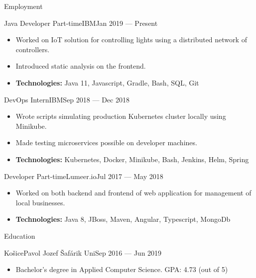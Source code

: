 \documentclass[]{style}
\begin{document}
	\makeheader

	\begin{cvsection}{Employment}
    	\begin{cvsubsection}{Java Developer Part-time}{IBM}{Jan 2019 — Present}
			\begin{itemize}
    			\item Worked on IoT solution for controlling lights using a distributed network of controllers.
    			\item Introduced static analysis on the frontend.
    			\item \textbf{Technologies:} Java 11, Javascript, Gradle, Bash, SQL, Git
			\end{itemize}
		\end{cvsubsection}
		
    	\begin{cvsubsection}{DevOps Intern}{IBM}{Sep 2018 — Dec 2018}
			\begin{itemize}
			    \item Wrote scripts simulating production Kubernetes cluster locally using Minikube.
			    \item Made testing microservices possible on developer machines.
			    \item \textbf{Technologies:} Kubernetes, Docker, Minikube, Bash, Jenkins, Helm, Spring
			\end{itemize}
		\end{cvsubsection}
		
		\begin{cvsubsection}{Developer Part-time}{Lumeer.io}{Jul 2017 — May 2018}
			\begin{itemize}
			    \item Worked on both backend and frontend of web application for management of local businesses.
				\item \textbf{Technologies:} Java 8, JBoss, Maven, Angular, Typescript, MongoDb
			\end{itemize}
		\end{cvsubsection}
	\end{cvsection}
	
	\begin{cvsection}{Education}
		\begin{cvsubsection}{Košice}{Pavol Jozef Šafárik Uni}{Sep 2016 — Jun 2019}
			\begin{itemize}
				\item Bachelor's degree in Applied Computer Science. GPA: 4.73 (out of 5)
			\end{itemize}
		\end{cvsubsection}
	\end{cvsection}
	
\end{document}
